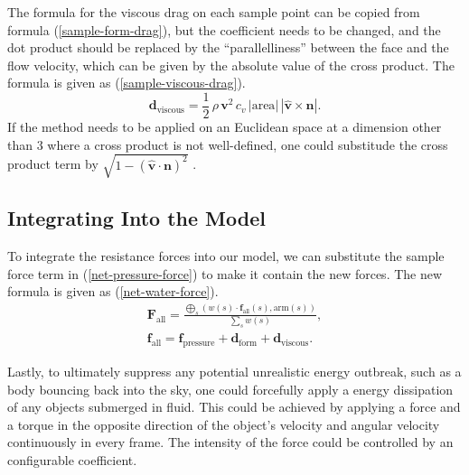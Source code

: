 The formula for the viscous drag on each sample point can be copied from formula (\ref{sample-form-drag}), but the coefficient needs to be changed, and the dot product should be replaced by the ``parallelliness'' between the face and the flow velocity, which can be given by the absolute value of the cross product.
The formula is given as (\ref{sample-viscous-drag}).
\begin{equation}
	\mathbf{d}_{\text{viscous}}=\frac{1}{2}\,\rho\,\mathbf{v}^2\,c_v\,|\text{area}|\,|\hat{\mathbf{v}}\times\mathbf{n}|.
	\label{sample-viscous-drag}
\end{equation}
If the method needs to be applied on an Euclidean space at a dimension other than 3 where a cross product is not well-defined, one could substitude the cross product term by $\sqrt{1-(\hat{\mathbf{v}}\cdot\mathbf{n})^2}$ \cite{blinn2003lines}.

\subsection{Integrating Into the Model}

To integrate the resistance forces into our model, we can substitute the sample force term in (\ref{net-pressure-force}) to make it contain the new forces.
The new formula is given as (\ref{net-water-force}).
\begin{equation}\begin{split}
	\mathbf{F}_{\text{all}}=\frac
		{
			\bigoplus_{s}
			\left(
				w(s)\cdot\mathbf{f}_{\text{all}}(s)
				,
				\text{arm}(s)
			\right)
		}
		{\sum_{s}w(s)},
	\\
	\mathbf{f}_{\text{all}}=\mathbf{f}_{\text{pressure}}+\mathbf{d}_{\text{form}}+\mathbf{d}_{\text{viscous}}.
	\label{net-water-force}
\end{split}\end{equation}

Lastly, to ultimately suppress any potential unrealistic energy outbreak, such as a body bouncing back into the sky, one could forcefully apply a energy dissipation of any objects submerged in fluid.
This could be achieved by applying a force and a torque in the opposite direction of the object's velocity and angular velocity continuously in every frame.
The intensity of the force could be controlled by an configurable coefficient.